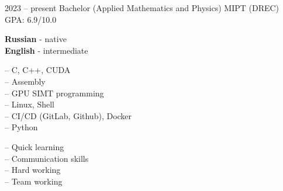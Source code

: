 \documentclass[9pt]{developercv} %
\begin{document}
\begin{entrylist}
\end{entrylist}



\begin{entrylist}
        \entry
                {2023 -- present}
                {Bachelor (Applied Mathematics and Physics)}
                {MIPT (DREC)}
                {GPA: 6.9/10.0 }

\end{entrylist}


\begin{minipage}[t]{0.3\textwidth}
        \vspace{-\baselineskip} %


        \textbf{Russian} - native\\
        \textbf{English} - intermediate
\end{minipage}
\hfill
\begin{minipage}[t]{0.3\textwidth}
        \vspace{-\baselineskip} %


        -- C, C++, CUDA\\
        -- Assembly\\
        -- GPU SIMT programming\\
        -- Linux, Shell\\
        -- CI/CD (GitLab, Github), Docker\\
        -- Python

\end{minipage}
\hfill
\begin{minipage}[t]{0.3\textwidth}
        \vspace{-\baselineskip} %


        -- Quick learning\\
        -- Communication skills\\
        -- Hard working\\
        -- Team working
\end{minipage}

\end{document}
